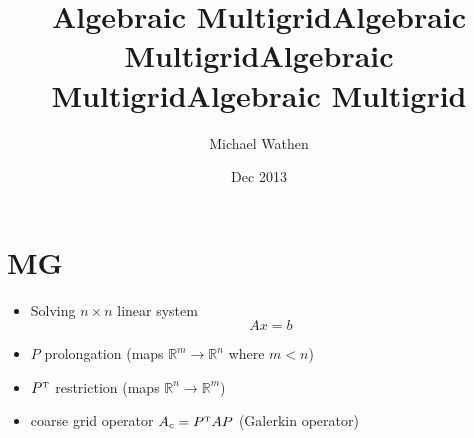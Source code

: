 \documentclass{beamer}
\title{Algebraic Multigrid}
\author{Michael Wathen}
\institute{UBC Computer Science}
\date{Dec 2013}
\begin{document}
\begin{frame}

\title{Algebraic Multigrid}
\titlepage
\title{Algebraic Multigrid}

\end{frame}

\title{Algebraic Multigrid}





\section{MG}
\begin{frame}

\begin{itemize}
  \item  Solving  $n\times n$ linear system$$Ax=b$$
  \item $P$ prolongation (maps $\mathbb{R}^m \rightarrow \mathbb{R}^n$ where $m<n$)
  \item $P^{\mbox{\tiny T}}$ restriction (maps $\mathbb{R}^n \rightarrow \mathbb{R}^m$)
  \item coarse grid operator $A_c = P^{\mbox{\tiny T}}AP$ (Galerkin operator)
\end{itemize}

\end{frame}
\end{document}
